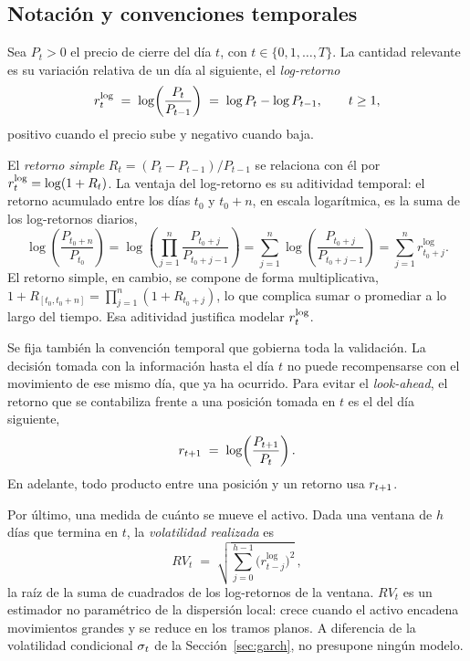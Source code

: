 \subsection{Notación y convenciones temporales}
\label{sec:preliminares}

Sea $P_t > 0$ el precio de cierre del día $t$, con $t \in \{0, 1, \dots, T\}$. La cantidad relevante es su variación relativa de un día al siguiente, el \emph{log-retorno}
\[
r_t^{\log} \;=\; \log\!\left(\frac{P_t}{P_{t-1}}\right) \;=\; \log P_t - \log P_{t-1}, \qquad t \ge 1,
\]
positivo cuando el precio sube y negativo cuando baja.

El \emph{retorno simple} $R_t = (P_t - P_{t-1})/P_{t-1}$ se relaciona con él por $r_t^{\log} = \log(1 + R_t)$. La ventaja del log-retorno es su aditividad temporal: el retorno acumulado entre los días $t_0$ y $t_0 + n$, en escala logarítmica, es la suma de los log-retornos diarios,
\[
\log\!\left(\frac{P_{t_0+n}}{P_{t_0}}\right)
= \log\!\left(\prod_{j=1}^{n} \frac{P_{t_0+j}}{P_{t_0+j-1}}\right)
= \sum_{j=1}^{n} \log\!\left(\frac{P_{t_0+j}}{P_{t_0+j-1}}\right)
= \sum_{j=1}^{n} r^{\log}_{t_0+j}.
\]
El retorno simple, en cambio, se compone de forma multiplicativa, $1 + R_{[t_0, t_0+n]} = \prod_{j=1}^{n}(1 + R_{t_0+j})$, lo que complica sumar o promediar a lo largo del tiempo. Esa aditividad justifica modelar $r_t^{\log}$.

Se fija también la convención temporal que gobierna toda la validación. La decisión tomada con la información hasta el día $t$ no puede recompensarse con el movimiento de ese mismo día, que ya ha ocurrido. Para evitar el \emph{look-ahead}, el retorno que se contabiliza frente a una posición tomada en $t$ es el del día siguiente,
\[
r_{t+1} \;=\; \log\!\left(\frac{P_{t+1}}{P_t}\right).
\]
En adelante, todo producto entre una posición y un retorno usa $r_{t+1}$.

Por último, una medida de cuánto se mueve el activo. Dada una ventana de $h$ días que termina en $t$, la \emph{volatilidad realizada} es
\[
RV_t \;=\; \sqrt{\sum_{j=0}^{h-1} \big(r^{\log}_{t-j}\big)^2}\,,
\]
la raíz de la suma de cuadrados de los log-retornos de la ventana. $RV_t$ es un estimador no paramétrico de la dispersión local: crece cuando el activo encadena movimientos grandes y se reduce en los tramos planos. A diferencia de la volatilidad condicional $\sigma_t$ de la Sección~\ref{sec:garch}, no presupone ningún modelo.

